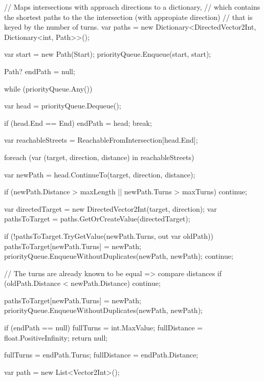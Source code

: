 \documentclass{article}
\begin{document}
\begin{lstcs}[]
{{        // Maps intersections with approach directions to a dictionary,
        // which contains the shortest paths to the the intersection (with appropiate direction)
        // that is keyed by the number of turns.
        var paths = new Dictionary<DirectedVector2Int, Dictionary<int, Path>>();

        var start = new Path(Start);
        priorityQueue.Enqueue(start, start);

        Path? endPath = null;

        while (priorityQueue.Any())
        {
            var head = priorityQueue.Dequeue();

            if (head.End == End)
            {
                endPath = head;
                break;
            }

            var reachableStreets = ReachableFromIntersection[head.End];

            foreach (var (target, direction, distance) in reachableStreets)
            {
                var newPath = head.ContinueTo(target, direction, distance);

                if (newPath.Distance > maxLength
                    || newPath.Turns > maxTurns)
                {
                    continue;
                }

                var directedTarget = new DirectedVector2Int(target, direction);
                var pathsToTarget = paths.GetOrCreateValue(directedTarget);

                if (!pathsToTarget.TryGetValue(newPath.Turns, out var oldPath))
                {
                    pathsToTarget[newPath.Turns] = newPath;
                    priorityQueue.EnqueueWithoutDuplicates(newPath, newPath);
                    continue;
                }

                // The turns are already known to be equal => compare distances
                if (oldPath.Distance < newPath.Distance) continue;

                pathsToTarget[newPath.Turns] = newPath;
                priorityQueue.EnqueueWithoutDuplicates(newPath, newPath);
            }
        }

        if (endPath == null)
        {
            fullTurns = int.MaxValue;
            fullDistance = float.PositiveInfinity;
            return null;
        }

        fullTurns = endPath.Turns;
        fullDistance = endPath.Distance;

        var path = new List<Vector2Int>();

}}
\end{lstcs}
\end{document}
